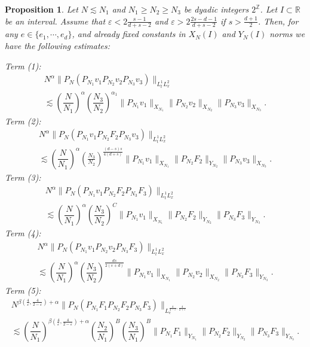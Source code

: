 \documentclass[10pt,leqno]{amsart}
\newtheorem{prop}[thm]{Proposition} %
\newcommand{\R}{\mathbb{R}} %
\numberwithin{equation}{section}
\newcommand{\Z}{\mathbb{Z}}
\begin{document}
\begin{prop}
\label{mainpropnonlinear}
Let $N \lesssim N_1 $ and $N_1 \geq N_2 \geq N_3$ be dyadic integers $2^{\Z}$. Let $I \subset \R$ be an interval. Assume that $\varepsilon < 2\frac{s-1}{d+s-2}$ and $\varepsilon>2 \frac{2s-d-1}{d+s-2}$ if $s>\frac{d+1}{2}$. Then, for any $e\in \{e_1, \cdots , e_d\}$, and already fixed constants in $X_N(I)$ and $Y_N(I)$ norms we have the following estimates:

\noindent
Term (1):
\begin{multline*}
N^\alpha \|P_N (P_{N_1} v_1 P_{N_2} v_2 P_{N_3}v_3)\|_{L^1_t L_x^2}\\
\lesssim \left(\dfrac{N}{N_1}\right)^{\alpha} \left(\dfrac{N_3}{N_2}\right)^{\alpha_1} \|P_{N_1}v_1\|_{X_{N_1}}\|P_{N_2}v_2\|_{X_{N_2}} \|P_{N_3}v_3\|_{X_{N_3}}. 
\end{multline*}
\noindent
Term (2):
\begin{multline*}
N^\alpha \|P_N (P_{N_1} v_1 P_{N_2} F_2 P_{N_3}v_3)\|_{L^1_t L_x^2}\\
\lesssim \left(\dfrac{N}{N_1}\right)^{\alpha} \left(\frac{N_3}{N_2} \right)^{\frac{(d-s)s}{4(d+s)}}  \|P_{N_1}v_1\|_{X_{N_1}}\|P_{N_2}F_2\|_{Y_{N_2}} \|P_{N_3}v_3\|_{X_{N_3}}. 
\end{multline*}
\noindent
Term (3):
\begin{multline*}
N^\alpha \|P_N (P_{N_1} v_1 P_{N_2} F_2 P_{N_3}F_3)\|_{L^1_t L_x^2}\\
\lesssim \left(\dfrac{N}{N_1}\right)^{\alpha} \left(\dfrac{N_3}{N_2}\right)^{C} \|P_{N_1}v_1\|_{X_{N_1}}\|P_{N_2}F_2\|_{Y_{N_2}} \|P_{N_3}F_3\|_{Y_{N_3}}. 
\end{multline*}
\noindent
Term (4):
\begin{multline*}
N^\alpha \|P_N (P_{N_1} v_1 P_{N_2} v_2 P_{N_3}F_3)\|_{L^1_t L_x^2}\\
\lesssim \left(\dfrac{N}{N_1}\right)^{\alpha} \left(\dfrac{N_3}{N_2}\right)^{\frac{ds}{2(s+d)}} \|P_{N_1}v_1\|_{X_{N_1}}\|P_{N_2}v_2\|_{X_{N_2}} \|P_{N_3}F_3\|_{Y_{N_3}}. 
\end{multline*}
\noindent
Term (5):
\begin{multline*}
N^{\beta (\frac{4}{\varepsilon},\frac{4}{2-\varepsilon}) +\alpha} \|P_N (P_{N_1} F_1 P_{N_2} F_2 P_{N_3} F_3) \|_{L_e^{\frac{4}{4-\varepsilon} , \frac{4}{2+\varepsilon}} }\\
 \lesssim \left(\dfrac{N}{N_1}\right)^{\beta  (\frac{4}{\varepsilon},\frac{4}{2-\varepsilon})+ \alpha} \left(\dfrac{N_2}{N_1}\right)^B \left(\dfrac{N_3}{N_1}\right)^{B} 
 \|P_{N_1}F_1\|_{Y_{N_1}}\|P_{N_2}F_2\|_{Y_{N_2}} \|P_{N_3}F_3\|_{Y_{N_3}}.  

\end{multline*}
\end{prop}
\end{document}
